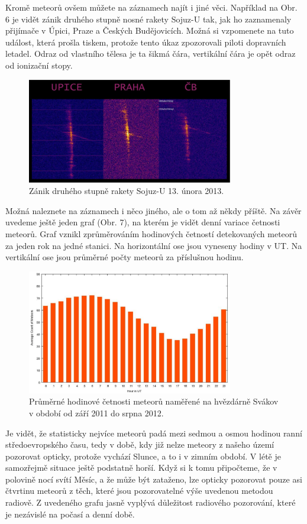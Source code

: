 \documentclass[10pt,a5paper,twoside]{book}
\begin{document}
Kromě meteorů ovšem můžete na záznamech najít i jiné věci. Například na Obr. 6 je vidět zánik druhého stupně nosné rakety Sojuz-U tak, jak ho zaznamenaly přijímače v Úpici, Praze a Českých Budějovicích. Možná si vzpomenete na tuto událost, která prošla tiskem, protože tento úkaz zpozorovali piloti dopravních letadel. Odraz od vlastního tělesa je ta šikmá čára, vertikální čára je opět odraz od ionizační stopy.
\begin{figure}[htbp]
	\begin{center}
		\includegraphics[width=9cm]{graves/graves_soubory/image008.eps}
	  	\caption{Zánik druhého stupně rakety Sojuz-U 13. února 2013.}
	  	\label{fig:}
	\end{center}
\end{figure}
Možná naleznete na záznamech i něco jiného, ale o tom až někdy příště. 
Na závěr uvedeme ještě jeden graf (Obr. 7), na kterém je vidět denní variace četnosti meteorů. Graf vznikl zprůměrováním hodinových četností detekovaných meteorů za jeden rok na jedné stanici. Na horizontální ose jsou vyneseny hodiny v UT. Na vertikální ose jsou průměrné počty meteorů za příslušnou hodinu. 
\begin{figure}[htbp]
	\begin{center}
		\includegraphics[width=9cm]{graves/graves_soubory/image009.eps}
	  	\caption{Průměrné hodinové četnosti meteorů naměřené na hvězdárně Svákov v období od září 2011 do srpna 2012.}
	  	\label{fig:}
	\end{center}
\end{figure}
Je vidět, že statisticky nejvíce meteorů padá mezi sedmou a osmou hodinou ranní středoevropského času, tedy v době, kdy již nelze meteory z našeho území pozorovat opticky, protože vychází Slunce, a to i v zimním období. V létě je samozřejmě situace ještě podstatně horší. Když si k tomu připočteme, že v polovině nocí svítí Měsíc, a že může být zataženo, lze opticky pozorovat pouze asi čtvrtinu meteorů z těch, které jsou pozorovatelné výše uvedenou metodou radiově. Z uvedeného grafu jasně vyplývá důležitost radiového pozorování, které je nezávislé na počasí a denní době.
\end{document}
